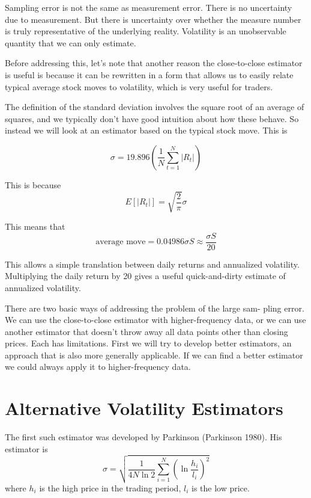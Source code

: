 \documentclass[11pt]{report}
\begin{document}
		Sampling error is not the same as measurement error. There is no uncertainty due to measurement. But there is uncertainty over whether the measure number is truly representative of the underlying reality. Volatility is an unobservable quantity that we can only estimate.

		Before addressing this, let's note that another reason the close-to-close estimator is useful is because it can be rewritten in a form that allows us to easily relate typical average stock moves to volatility, which is very useful for traders.

		The definition of the standard deviation involves the square root of an average of squares, and we typically don't have good intuition about how these behave. So instead we will look at an estimator based on the typical stock move. This is

		\begin{equation}
			\sigma = 19.896 \left(\frac{1}{N} \sum_{t=1}^N |R_t| \right)
		\end{equation}

		This is because
		\begin{equation}
			E[|R_t|] = \sqrt{\frac{2}{\pi}} \sigma
		\end{equation}

		This means that
		\begin{equation}
			\text{average move} = 0.04986\sigma S \approx \frac{\sigma S}{20}
		\end{equation}

		This allows a simple translation between daily returns and annualized volatility. Multiplying the daily return by 20 gives a useful quick-and-dirty estimate of annualized volatility.

		There are two basic ways of addressing the problem of the large sam- pling error. We can use the close-to-close estimator with higher-frequency data, or we can use another estimator that doesn't throw away all data points other than closing prices. Each has limitations. First we will try to develop better estimators, an approach that is also more generally applicable. If we can find a better estimator we could always apply it to higher-frequency data.

	\section{Alternative Volatility Estimators}

		The first such estimator was developed by Parkinson (Parkinson 1980). His estimator is
		\begin{equation}
			\sigma = \sqrt{\frac{1}{4N\ln2} \sum_{i=1}^N \left(\ln\frac{h_i}{l_i}\right)^2}
		\end{equation}
		where $h_i$ is the high price in the trading period, $l_i$ is the low price.
\end{document}
